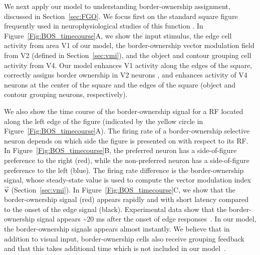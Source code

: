 We next apply our model to understanding border-ownership assignment,
discussed in Section~\ref{sec:FGO}. We focus first on the standard
square figure frequently used in neurophysiological studies of this
function
\citep{Zhou_etal00,Qiu_etal07,Sugihara_etal11,Williford_vonderHeydt13,Williford_vonderHeydt14,Martin_vonderHeydt15}. In Figure~\ref{Fig:BOS_timecourse}A, we show the input stimulus, the edge cell activity from area V1 of our model, the border-ownership vector
modulation field from V2 (defined in Section~\ref{sec:vmi}), and the
object and contour grouping cell activity from V4. Our model enhances V1 activity along the edges of the square, correctly assigns border ownership in V2 neurons \citep[in agreement with][] {Zhou_etal00},
and enhances activity of V4 neurons at the center of the square and the
edges of the square (object and contour grouping neurons, respectively). 

We also show the time course of the border-ownership signal for a RF
located along the left edge of the figure (indicated by the yellow
circle in Figure~\ref{Fig:BOS_timecourse}A). The firing rate of a
border-ownership selective neuron depends on which side the figure is
presented on with respect to its RF. In Figure~\ref{Fig:BOS_timecourse}B, the preferred neuron has a side-of-figure preference to the right (red), while the non-preferred
neuron has a side-of-figure preference to the left (blue). The firing
rate difference is the border-ownership signal, whose steady-state
value is used to compute the vector modulation index $\overrightarrow{\mathbf{v}}$ (Section~\ref{sec:vmi}). In Figure~\ref{Fig:BOS_timecourse}C, we show that the border-ownership signal (red) appears rapidly and with short latency compared to the onset of the edge signal (black). Experimental data show that the border-ownership signal appears \textasciitilde 20 ms after the onset of edge responses~\citep{Zhou_etal00}. In our model, the border-ownership signals appears almost instantly. We believe that in addition to visual input, border-ownership cells also receive grouping feedback and that this takes additional time which is not included in our model~\citep[see][as an example of a model with
latencies]{Craft_etal07}.  


